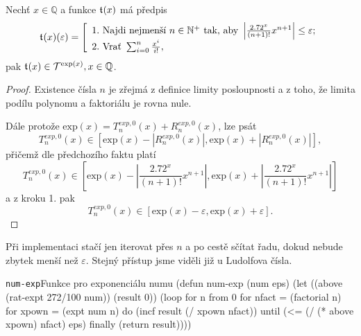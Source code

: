 \begin{consequence}
Nechť $x\in\mathbb{Q}$ a funkce $\mathfrak{t}^{}(x)$ má předpis
\begin{equation}
\mathfrak{t}^{}(x)(\varepsilon)=\left[\begin{array}{l}\mathrm{1.~}\text{Najdi~nejmenší~}n\in\mathbb{N}^+\text{~tak,~aby~}\left|\frac{2.72^x}{(n+1)!}x^{n+1}\right| \leq \varepsilon;\\
\mathrm{2.~}\text{Vrať~}\sum_{i=0}^n \frac{x^i}{i!},\end{array}\right.
\end{equation}
pak $\mathfrak{t}^{}(x)\in\mathcal{T}^{\mathrm{exp}(x)},x\in\mathbb{Q}$.
\begin{proof}
Existence čísla $n$ je zřejmá z definice limity posloupnosti a z toho, že limita podílu polynomu a faktoriálu je rovna nule.

Dále protože $\mathrm{exp}(x) = T^{exp, 0}_n(x)+R^{exp, 0}_n(x)$, lze psát
\begin{equation}
T^{exp, 0}_n(x) \in [\mathrm{exp}(x) - |R^{exp, 0}_n(x)|, \mathrm{exp}(x) + |R^{exp, 0}_n(x)|],
\end{equation}
přičemž dle předchozího faktu platí
\begin{equation}
T^{exp, 0}_n(x) \in \left[\mathrm{exp}(x) - \left| \frac{2.72^x}{(n+1)!}x^{n+1} \right|, \mathrm{exp}(x) + \left| \frac{2.72^x}{(n+1)!}x^{n+1} \right|\right]
\end{equation}
a z kroku 1. pak
\begin{equation}
T^{exp, 0}_n(x) \in [\mathrm{exp}(x) - \varepsilon, \mathrm{exp}(x) + \varepsilon].
\end{equation}
\end{proof}
\end{consequence}

Při implementaci stačí jen iterovat přes $n$ a po cestě sčítat řadu, dokud nebude zbytek menší než $\varepsilon$. Stejný přístup jsme viděli již u Ludolfova čísla.

\begin{lispcode}{\texttt{num-exp}}{Funkce pro exponenciálu numu}
(\textcolor{funkcionalni}{defun} \textcolor{pojmenovan}{num-exp} (num eps)
  (\textcolor{vedlejsi}{let} ((above (\textcolor{moje}{rat-expt} 272/100 num)) (result 0))
    (\textcolor{funkcionalni}{loop} \textcolor{obarvi}{for} n \textcolor{obarvi}{from} 0
          \textcolor{obarvi}{for} nfact = (\textcolor{moje}{factorial} n)
          \textcolor{obarvi}{for} xpown = (\textcolor{matematicke}{expt} num n)
          \textcolor{obarvi}{do} (\textcolor{vedlejsi}{incf} result (\textcolor{matematicke}{/} xpown nfact))
          \textcolor{obarvi}{until} (\textcolor{matematicke}{<=} (\textcolor{matematicke}{/} (\textcolor{matematicke}{*} above xpown) nfact) eps)
          \textcolor{obarvi}{finally} (\textcolor{funkcionalni}{return} result))))
\end{lispcode}

